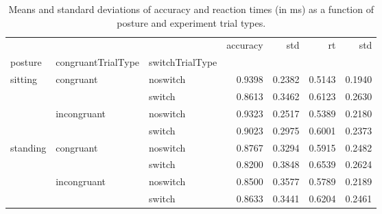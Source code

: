 \begin{table}
\centering
\caption{Means and standard deviations of accuracy and reaction times (in ms) as a function of posture and experiment trial types.}
\label{table-task-switching-replication-reaction-time}
\begin{tabular}{lllrrrr}
\toprule
         &             &        & accuracy &    std &     rt &    std \\
posture & congruantTrialType & switchTrialType &          &        &        &        \\
\midrule
sitting & congruant & noswitch &   0.9398 & 0.2382 & 0.5143 & 0.1940 \\
         &             & switch &   0.8613 & 0.3462 & 0.6123 & 0.2630 \\
         & incongruant & noswitch &   0.9323 & 0.2517 & 0.5389 & 0.2180 \\
         &             & switch &   0.9023 & 0.2975 & 0.6001 & 0.2373 \\
standing & congruant & noswitch &   0.8767 & 0.3294 & 0.5915 & 0.2482 \\
         &             & switch &   0.8200 & 0.3848 & 0.6539 & 0.2624 \\
         & incongruant & noswitch &   0.8500 & 0.3577 & 0.5789 & 0.2189 \\
         &             & switch &   0.8633 & 0.3441 & 0.6204 & 0.2461 \\
\bottomrule
\end{tabular}
\end{table}
